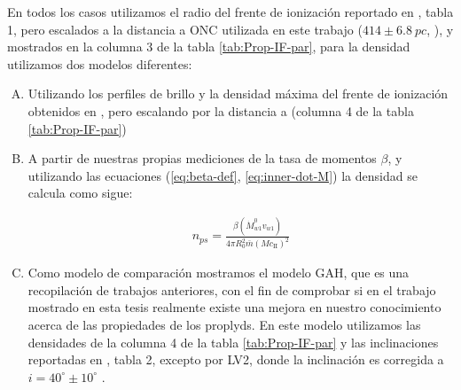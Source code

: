 En todos los casos utilizamos el radio del frente de ionización reportado en \citet{Garcia-Arredondo:2001}, tabla 1, pero escalados a la distancia a ONC utilizada en este trabajo ($414 \pm \SI{6.8}{pc}$, \citet{Menten:2007}), y mostrados en la columna 3 de la tabla \ref{tab:Prop-IF-par}, para la densidad utilizamos dos modelos diferentes:

\begin{enumerate}[A.]
\item Utilizando los perfiles de brillo y la densidad máxima del frente de ionización obtenidos en \citet{Garcia-Arredondo:2001}, pero escalando por la distancia a \thC{} (columna 4 de la tabla \ref{tab:Prop-IF-par})
\item A partir de nuestras propias mediciones de la tasa de momentos $\beta$, y utilizando las ecuaciones (\ref{eq:beta-def}, \ref{eq:inner-dot-M}) la densidad se calcula como sigue:

  \begin{align}
    n_{ps} = \frac{\beta\left(\dot{M}^0_{w1}v_{w1}\right)}{4\pi R^2_0 \bar{m}\left(M c_{\mathrm{II}}\right)^2} \label{eq:b-density}
  \end{align}
\item Como modelo de comparación mostramos el modelo GAH, que es una recopilación de trabajos anteriores, con el fin de comprobar si en el trabajo mostrado en esta tesis realmente existe una mejora en nuestro conocimiento acerca de las propiedades de los proplyds. En este modelo utilizamos las densidades de la columna 4 de la tabla \ref{tab:Prop-IF-par} y las inclinaciones reportadas en \citet{HA:1998}, tabla 2, excepto por LV2, donde la inclinación es corregida a $i=40^\circ \pm 10^\circ$ \citep{Henney:2002, Garcia-Arredondo:2001}.
\end{enumerate}


